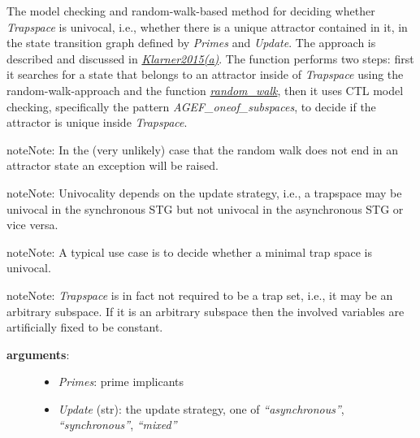 \documentclass[letterpaper,10pt,english]{sphinxmanual}
\begin{document}
\begin{fulllineitems}
\label{AttractorDetection:PyBoolNet.AttractorDetection.univocality}
The model checking and random-walk-based method for deciding whether \emph{Trapspace} is univocal,
i.e., whether there is a unique attractor contained in it,
in the state transition graph defined by \emph{Primes} and \emph{Update}.
The approach is described and discussed in {\hyperref[Bibliography:klarner2015trap]{\emph{Klarner2015(a)}}}.
The function performs two steps: first it searches for a state that belongs to an attractor inside of \emph{Trapspace} using
the random-walk-approach and the function {\hyperref[StateTransitionGraphs:random-walk]{\emph{random\_walk}}},
then it uses CTL model checking, specifically the pattern \emph{AGEF\_oneof\_subspaces},
to decide if the attractor is unique inside \emph{Trapspace}.

\begin{notice}{note}{Note:}
In the (very unlikely) case that the random walk does not end in an attractor state an exception will be raised.
\end{notice}

\begin{notice}{note}{Note:}
Univocality depends on the update strategy, i.e.,
a trapspace may be univocal in the synchronous STG but not univocal in the asynchronous STG or vice versa.
\end{notice}

\begin{notice}{note}{Note:}
A typical use case is to decide whether a minimal trap space is univocal.
\end{notice}

\begin{notice}{note}{Note:}
\emph{Trapspace} is in fact not required to be a trap set, i.e., it may be an arbitrary subspace.
If it is an arbitrary subspace then the involved variables are artificially fixed to be constant.
\end{notice}
\begin{description}
\item[{\textbf{arguments}:}] \leavevmode\begin{itemize}
\item {} 
\emph{Primes}: prime implicants

\item {} 
\emph{Update} (str): the update strategy, one of \emph{``asynchronous''}, \emph{``synchronous''}, \emph{``mixed''}


\end{itemize}
\end{description}
\end{fulllineitems}
\end{document}
